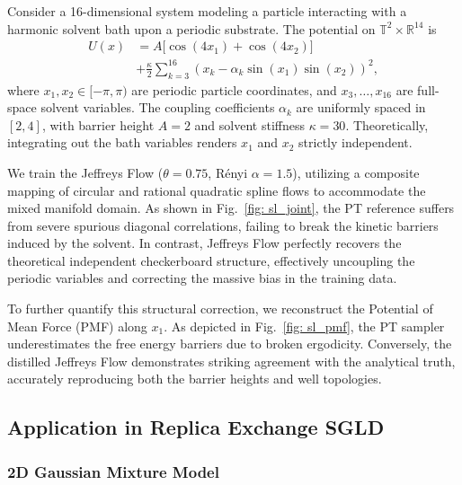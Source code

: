 \documentclass[%
 reprint,
 amsmath,amssymb,
 aps,
 pre,
]{revtex4-2}
\begin{document}
Consider a 16-dimensional system modeling a particle interacting with a harmonic solvent bath upon a periodic substrate. The potential on $\mathbb{T}^2 \times \mathbb{R}^{14}$ is
\begin{align*}
	U(x) & = A \big[ \cos(4x_1) + \cos(4x_2) \big] \\
	& + \frac{\kappa}{2} \sum_{k=3}^{16} (x_k - \alpha_k \sin(x_1) \sin(x_2))^2,
\end{align*}
where $x_1, x_2 \in [-\pi, \pi)$ are periodic particle coordinates, and $x_3, \ldots, x_{16}$ are full-space solvent variables. The coupling coefficients $\alpha_k$ are uniformly spaced in $[2, 4]$, with barrier height $A=2$ and solvent stiffness $\kappa=30$. Theoretically, integrating out the bath variables renders $x_1$ and $x_2$ strictly independent.

We train the Jeffreys Flow ($\theta = 0.75$, R\'enyi $\alpha=1.5$), utilizing a composite mapping of circular and rational quadratic spline flows to accommodate the mixed manifold domain. As shown in Fig.~\ref{fig: sl_joint}, the PT reference suffers from severe spurious diagonal correlations, failing to break the kinetic barriers induced by the solvent. In contrast, Jeffreys Flow perfectly recovers the theoretical independent checkerboard structure, effectively uncoupling the periodic variables and correcting the massive bias in the training data.

To further quantify this structural correction, we reconstruct the Potential of Mean Force (PMF) along $x_1$. As depicted in Fig.~\ref{fig: sl_pmf}, the PT sampler underestimates the free energy barriers due to broken ergodicity. Conversely, the distilled Jeffreys Flow demonstrates striking agreement with the analytical truth, accurately reproducing both the barrier heights and well topologies.

\subsection{Application in Replica Exchange SGLD}
\label{subsection: numerical reSGLD}

\subsubsection*{2D Gaussian Mixture Model}
\end{document}
